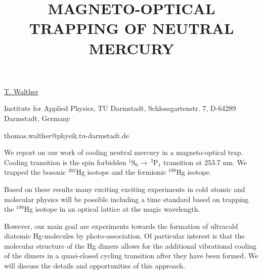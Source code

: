 \title{MAGNETO-OPTICAL TRAPPING OF NEUTRAL MERCURY}

\underline{T. Walther} 

{\normalsize{\vspace{-4mm}
Institute for Applied Physics, TU Darmstadt, Schlossgartenstr. 7, D-64289 Darmstadt, Germany

\email thomas.walther@physik.tu-darmstadt.de}}

We report on our work of cooling neutral mercury in a magneto-optical trap. Cooling transition is the spin forbidden $^1\text{S}_0\rightarrow\,^3\text{P}_1$ transition at 253.7 nm.  We trapped the bosonic $^{202}$Hg isotope and the fermionic $^{199}$Hg isotope.

Based on these results many exciting exciting experiments in cold atomic and molecular physics will be possible including a time standard based on trapping the $^{199}$Hg isotope in an optical lattice at the magic wavelength.

However, our main goal are experiments towards the formation of ultracold diatomic Hg-molecules by photo-association. Of particular interest is that the molecular structure of the Hg dimers allows for the additional vibrational cooling of the dimers in a quasi-closed cycling transition after they have been formed. We will discuss the details and opportunities of this approach.

\vspace{\baselineskip} 